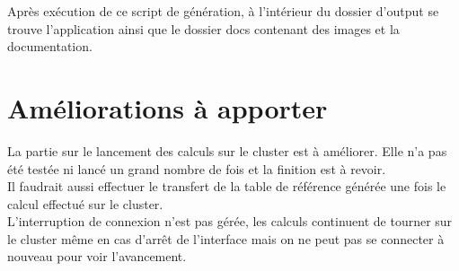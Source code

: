 \documentclass[12pt,a4paper]{article}
\begin{document}
        Après exécution de ce script de génération, à l'intérieur du dossier
        d'output se trouve l'application ainsi que le dossier docs contenant des
        images et la documentation.

\section{Améliorations à apporter}
    La partie sur le lancement des calculs sur le cluster est à améliorer. Elle
    n'a pas été testée ni lancé un grand nombre de fois et la finition est à
    revoir.\\
    
    Il faudrait aussi effectuer le transfert de la table de référence
    générée une fois le calcul effectué sur le cluster.\\
    
    L'interruption de
    connexion n'est pas gérée, les calculs continuent de tourner sur le cluster
    même en cas d'arrêt de l'interface mais on ne peut pas se connecter à
    nouveau pour voir l'avancement.
\end{document}
